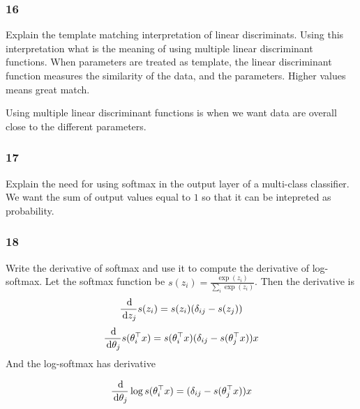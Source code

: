 \documentclass{article}
\begin{document}
\subsubsection*{16}
\begin{myleftlinebox}
    Explain the template matching interpretation of linear discriminats. Using this interpretation what is the meaning of using multiple linear discriminant functions.
    \tcblower
    When parameters are treated as template, the linear discriminant function measures the similarity of the data, and the parameters. Higher values means great match.

    Using multiple linear discriminant functions is when we want data are overall close to the different parameters.
\end{myleftlinebox}

\subsubsection*{17}
\begin{myleftlinebox}
    Explain the need for using softmax in the output layer of a multi-class classifier.
    \tcblower
    We want the sum of output values equal to \(1\) so that it can be intepreted as probability.
\end{myleftlinebox}

\subsubsection*{18}
\begin{myleftlinebox}
    Write the derivative of softmax and use it to compute the derivative of log-softmax.
    \tcblower
    Let the softmax function be \(s(z_i)=\frac{\exp(z_i)}{\sum_i \exp(z_i)}\). Then the derivative is
    \[
        \frac{\,\mathrm{d}}{\,\mathrm{d} z_j} s (z_i)=s(z_i)(\delta_{ij}-s(z_j))
    \]
    \[
        \frac{\,\mathrm{d}}{\,\mathrm{d} \theta_j} s(\theta^\top_i x) = s(\theta^\top_i x) (\delta_{ij}-s(\theta^\top_j x))x
    \]
    And the log-softmax has derivative

    \[
        \frac{\,\mathrm{d}}{\,\mathrm{d} \theta_j} \log s(\theta^\top_i x) =  (\delta_{ij}-s(\theta^\top_j x))x
    \]
\end{myleftlinebox}
\end{document}
